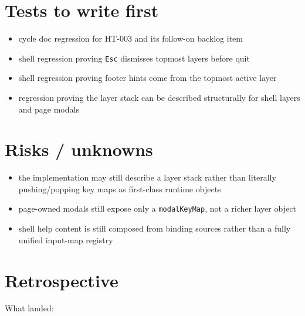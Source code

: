 \section{Tests to write first}\label{record-255-tests-to-write-first}

\begin{itemize}
\tightlist
\item
  cycle doc regression for HT-003 and its follow-on backlog item
\item
  shell regression proving \texttt{E\allowbreak{}s\allowbreak{}c} dismisses topmost layers before quit
\item
  shell regression proving footer hints come from the topmost active layer
\item
  regression proving the layer stack can be described structurally for shell layers and page modals
\end{itemize}

\section{Risks / unknowns}\label{record-255-risks-unknowns}

\begin{itemize}
\tightlist
\item
  the implementation may still describe a layer stack rather than literally pushing/popping key maps as first-class runtime objects
\item
  page-owned modals still expose only a \texttt{m\allowbreak{}o\allowbreak{}d\allowbreak{}a\allowbreak{}l\allowbreak{}K\allowbreak{}e\allowbreak{}y\allowbreak{}M\allowbreak{}a\allowbreak{}p}, not a richer layer object
\item
  shell help content is still composed from binding sources rather than a fully unified input-map registry
\end{itemize}

\section{Retrospective}\label{record-255-retrospective}

What landed:

